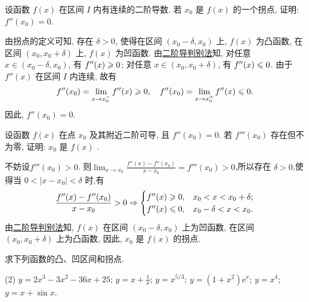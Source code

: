 \begin{exercise}[3.5.6]
    设函数 $f(x)$ 在区间 $I$ 内有连续的二阶导数. 若 $x_0$ 是 $f(x)$ 的一个拐点, 证明: $f''(x_0) = 0$.
\end{exercise}

\begin{solution}
    由拐点的定义可知, 存在 $\delta > 0$, 使得在区间 $(x_0 - \delta, x_0)$ 上, $f(x)$ 为凸函数, 在区间 $(x_0, x_0 + \delta)$ 上, $f(x)$ 为凹函数. 由\hyperref[thm:3.28]{二阶导判别法}知, 对任意 $x \in (x_0 - \delta, x_0)$, 有 $f''(x) \geqslant 0$; 对任意 $x \in (x_0, x_0 + \delta)$, 有 $f''(x) \leqslant 0$. 由于 $f''(x)$ 在区间 $I$ 内连续, 故有
    $$f''(x_0) = \lim_{x \to x_0^-} f''(x) \geqslant 0, \quad f''(x_0) = \lim_{x \to x_0^+} f''(x) \leqslant 0.$$
    因此, $f''(x_0) = 0$.
\end{solution}

\begin{exercise}[3.5.7]
    设函数 $f(x)$ 在点 $x_0$ 及其附近二阶可导, 且 $f''(x_0) = 0$. 若 $f'''(x_0)$ 存在但不为零, 证明: $x_0$ 是 $f(x)$ .
\end{exercise}

\begin{solution}
    不妨设$f'''(x_0) > 0$. 则$\lim_{x \to x_0} \frac{f''(x) - f''(x_0)}{x - x_0} = f'''(x_0) > 0$,所以存在 $\delta > 0$,使得当 $0 < |x - x_0| < \delta$ 时,有
    $$
        \frac{f''(x) - f''(x_0)}{x - x_0} > 0 \Rightarrow \begin{cases}
            f''(x) \geqslant 0, & x_0 < x < x_0 + \delta; \\
            f''(x) \leqslant 0, & x_0 - \delta < x < x_0.
        \end{cases}
    $$
    由\hyperref[thm:3.28]{二阶导判别法}知, $f(x)$ 在区间 $(x_0 - \delta, x_0)$ 上为凹函数, 在区间 $(x_0, x_0 + \delta)$ 上为凸函数, 因此, $x_0$ 是 $f(x)$ 的拐点.
\end{solution}

\begin{exercise}[3.5.8]
    求下列函数的凸、凹区间和拐点.
    \begin{tasks}(2)
        \task $y = 2x^3 - 3x^2 - 36x + 25$;
        \task $y = x + \frac{1}{x}$;
        \task $y = x^{5/3}$;
        \task $y = (1 + x^2)\mathrm{e}^x$;
        \task $y = x^4$;
        \task $y = x + \sin x$.
    \end{tasks}
\end{exercise}

